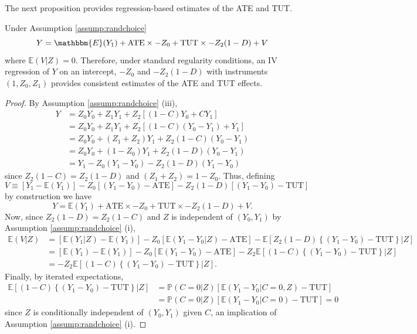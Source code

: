 The next proposition provides regression-based estimates of the ATE and TUT.
\begin{prop}
\label{prop:TUTreg}
Under Assumption \ref{assump:randchoice}
\[
Y = \mathbbm{E}(Y_1) + \text{ATE}\times -Z_0 + \text{TUT} \times -Z_2 (1 - D) + V
\] 
where $\mathbb{E}(V|Z) = 0$.
Therefore, under standard regularity conditions, an IV regression of $Y$ on an intercept, $-Z_0$ and $-Z_2(1-D)$ with instruments $(1, Z_0, Z_1)$ provides consistent estimates of the ATE and TUT effects.
\end{prop}

\begin{proof}
By Assumption \ref{assump:randchoice} (iii),
\begin{align*}
Y &= Z_0 Y_0 + Z_1 Y_1 + Z_2[(1 - C) Y_0 + CY_1]\\
&= Z_0 Y_0 + Z_1 Y_1 + Z_2[(1 - C) (Y_0 - Y_1) + Y_1]\\
&= Z_0 Y_0 + (Z_1 + Z_2) Y_1 + Z_2(1 - C) (Y_0 - Y_1) \\
&= Z_0 Y_0 + (1 - Z_0) Y_1 + Z_2(1 - D) (Y_0 - Y_1) \\
&= Y_1 - Z_0 (Y_1 - Y_0) - Z_2(1 - D) (Y_1 - Y_0)
\end{align*}
since $Z_2(1 - C)= Z_2(1 - D)$ and $(Z_1 + Z_2) = 1 - Z_0$.
Thus, defining 
\[
V \equiv [Y_1 - \mathbb{E}(Y_1)] - Z_0[(Y_1 - Y_0) - \text{ATE}] - Z_2(1 - D)[(Y_1 - Y_0) - \text{TUT}]
\]
by construction we have
\[
Y = \mathbb{E}(Y_1) + \text{ATE} \times -Z_0 + \text{TUT} \times -Z_2(1 - D) + V.
\]
Now, since $Z_2(1 - D) = Z_2 (1 - C)$ and $Z$ is independent of $(Y_0, Y_1)$ by Assumption \ref{assump:randchoice} (i),
\begin{align*}
\mathbb{E}(V|Z) &= [\mathbb{E}(Y_1|Z) - \mathbb{E}(Y_1)] - Z_0[\mathbb{E}(Y_1 - Y_0|Z) - \text{ATE}] - \mathbb{E}[Z_2(1 - D)\left\{(Y_1 - Y_0) - \text{TUT}\right\}|Z]\\
&= [\mathbb{E}(Y_1) - \mathbb{E}(Y_1)] - Z_0[\mathbb{E}(Y_1 - Y_0) - \text{ATE}] - Z_2\mathbb{E}[(1 - C)\left\{(Y_1 - Y_0) - \text{TUT}\right\}|Z]\\
&= -Z_2\mathbb{E}[(1 - C)\left\{(Y_1 - Y_0) - \text{TUT}\right\}|Z].
\end{align*}
Finally, by iterated expectations,
\begin{align*}
\mathbb{E}[(1 - C)\left\{(Y_1 - Y_0) - \text{TUT}\right\}|Z]&= \mathbb{P}(C=0|Z)\left[ \mathbb{E}(Y_1 - Y_0|C=0, Z) - \text{TUT}\right]\\
&= \mathbb{P}(C=0|Z) \left[ \mathbb{E}(Y_1 - Y_0|C=0) - \text{TUT}\right] = 0
\end{align*}
since $Z$ is conditionally independent of $(Y_0, Y_1)$ given $C$, an implication of Assumption \ref{assump:randchoice} (i).
\end{proof}

